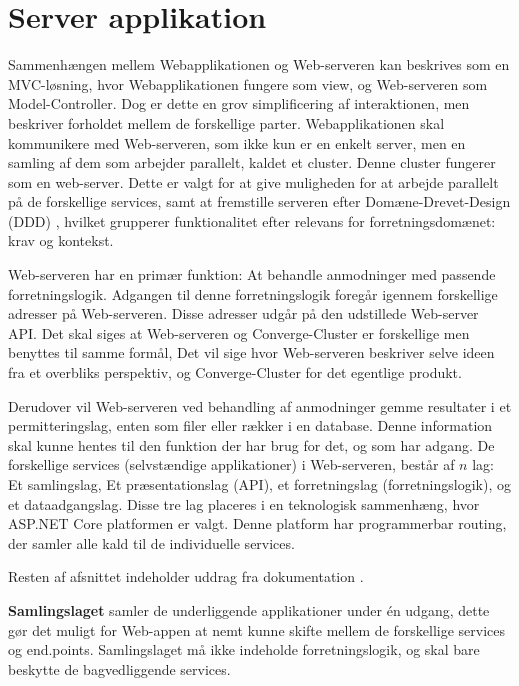 
\section{Server applikation}

Sammenhængen mellem Webapplikationen og Web-serveren kan beskrives som en MVC-løsning, hvor Webapplikationen fungere som view, og Web-serveren som Model-Controller. Dog er dette en grov simplificering af interaktionen, men beskriver forholdet mellem de forskellige parter. Webapplikationen skal kommunikere med Web-serveren, som ikke kun er en enkelt server, men en samling af dem som arbejder parallelt, kaldet et cluster. Denne cluster fungerer som en web-server. Dette er valgt for at give muligheden for at arbejde parallelt på de forskellige services, samt at fremstille serveren efter Domæne-Drevet-Design (DDD) \cite[DDD]{converge-terms}, hvilket grupperer funktionalitet efter relevans for forretningsdomænet: krav og kontekst.

Web-serveren har en primær funktion: At behandle anmodninger med passende forretningslogik. Adgangen til denne forretningslogik foregår igennem forskellige adresser på Web-serveren. Disse adresser udgår på den udstillede Web-server API. Det skal siges at Web-serveren og Converge-Cluster er forskellige men benyttes til samme formål, Det vil sige hvor Web-serveren beskriver selve ideen fra et overbliks perspektiv, og Converge-Cluster for det egentlige produkt.

Derudover vil Web-serveren ved behandling af anmodninger gemme resultater i et permitteringslag, enten som filer eller rækker i en database. Denne information skal kunne hentes til den funktion der har brug for det, og som har adgang. De forskellige services (selvstændige applikationer) i Web-serveren,  består af $n$ lag: Et samlingslag, Et præsentationslag (API), et forretningslag (forretningslogik), og et dataadgangslag. Disse tre lag placeres i en teknologisk sammenhæng, hvor ASP.NET Core platformen er valgt. Denne platform har programmerbar routing, der samler alle kald til de individuelle services.

Resten af afsnittet indeholder uddrag fra dokumentation \cite{software-architecture}.



\textbf{Samlingslaget} samler de underliggende applikationer under én udgang, dette gør det muligt for Web-appen at nemt kunne skifte mellem de forskellige services og end.points. Samlingslaget må ikke indeholde forretningslogik, og skal bare beskytte de bagvedliggende services.

